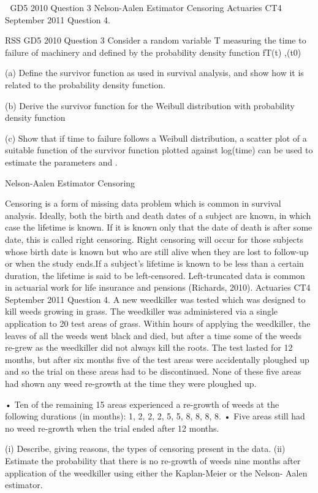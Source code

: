 

GD5 2010 Question 3
Nelson-Aalen Estimator
Censoring
Actuaries CT4 September 2011 Question 4.

RSS GD5 2010 Question 3
Consider a random variable T measuring the time to failure of machinery and defined by the probability density function
 fT(t) ,(t0)
 
(a) Define the survivor function as used in survival analysis, and show how it is related to the probability density function.
 
(b) Derive the survivor function for the Weibull distribution with probability density function
     
 
(c) Show that if time to failure follows a Weibull distribution, a scatter plot of a suitable function of the survivor function plotted against log(time) can be used to estimate the parameters  and  .

Nelson-Aalen Estimator
Censoring

Censoring is a form of missing data problem which is common in survival analysis. Ideally, both the birth and death dates of a subject are known, in which case the lifetime is known.
If it is known only that the date of death is after some date, this is called right censoring. Right censoring will occur for those subjects whose birth date is known but who are still alive when they are lost to follow-up or when the study ends.If a subject's lifetime is known to be less than a certain duration, the lifetime is said to be left-censored. Left-truncated data is common in actuarial work for life insurance and pensions (Richards, 2010).
Actuaries CT4 September 2011 Question 4.
A new weedkiller was tested which was designed to kill weeds growing in grass. The weedkiller was administered via a single application to 20 test areas of grass. Within
hours of applying the weedkiller, the leaves of all the weeds went black and died, but after a time some of the weeds re-grew as the weedkiller did not always kill the roots.
The test lasted for 12 months, but after six months five of the test areas were accidentally ploughed up and so the trial on these areas had to be discontinued. None
of these five areas had shown any weed re-growth at the time they were ploughed up.

• Ten of the remaining 15 areas experienced a re-growth of weeds at the following durations (in months): 1, 2, 2, 2, 5, 5, 8, 8, 8, 8.
• Five areas still had no weed re-growth when the trial ended after 12 months.

(i) Describe, giving reasons, the types of censoring present in the data. 
(ii) Estimate the probability that there is no re-growth of weeds nine months after application of the weedkiller using either the Kaplan-Meier or the Nelson-
Aalen estimator. 


